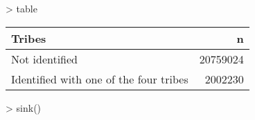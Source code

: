 
> table %

\begin{tabular}{l|r}
\hline
Tribes & n\\
\hline
Not identified & 20759024\\
\hline
Identified with one of the four tribes & 2002230\\
\hline
\end{tabular}

> sink()
